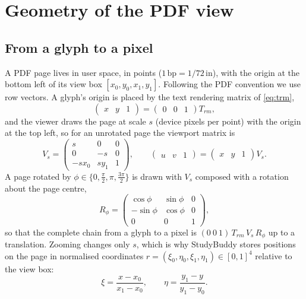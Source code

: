 \section{Geometry of the PDF view}
\label{sec:geometry}

\subsection{From a glyph to a pixel}

A PDF page lives in user space, in points ($1\,\mathrm{bp} = 1/72$\,in), with
the origin at the bottom left of its view box $[x_0, y_0, x_1, y_1]$. Following
the PDF convention we use row vectors. A glyph's origin is placed by the text
rendering matrix of \cref{eq:trm},
\begin{equation}
  \begin{pmatrix} x & y & 1 \end{pmatrix}
  = \begin{pmatrix} 0 & 0 & 1 \end{pmatrix} T_{rm} ,
\end{equation}
and the viewer draws the page at scale $s$ (device pixels per point) with the
origin at the top left, so for an unrotated page the viewport matrix is
\begin{equation}
  V_s =
  \begin{pmatrix}
    s & 0 & 0 \\
    0 & -s & 0 \\
    -s x_0 & s y_1 & 1
  \end{pmatrix},
  \qquad
  \begin{pmatrix} u & v & 1 \end{pmatrix}
  = \begin{pmatrix} x & y & 1 \end{pmatrix} V_s .
  \label{eq:viewport}
\end{equation}
A page rotated by $\phi \in \{0, \tfrac{\pi}{2}, \pi, \tfrac{3\pi}{2}\}$ is
drawn with $V_s$ composed with a rotation about the page centre,
\begin{equation}
  R_{\phi} =
  \begin{pmatrix}
    \cos\phi & \sin\phi & 0 \\
    -\sin\phi & \cos\phi & 0 \\
    0 & 0 & 1
  \end{pmatrix},
\end{equation}
so that the complete chain from a glyph to a pixel is
$(0\ 0\ 1)\, T_{rm}\, V_s\, R_{\phi}$ up to a translation. Zooming changes only
$s$, which is why StudyBuddy stores positions on the page in normalised
coordinates $r = (\xi_0, \eta_0, \xi_1, \eta_1) \in [0,1]^4$ relative to the
view box:
\begin{equation}
  \xi = \frac{x - x_0}{x_1 - x_0}, \qquad
  \eta = \frac{y_1 - y}{y_1 - y_0} .
  \label{eq:normalised}
\end{equation}

